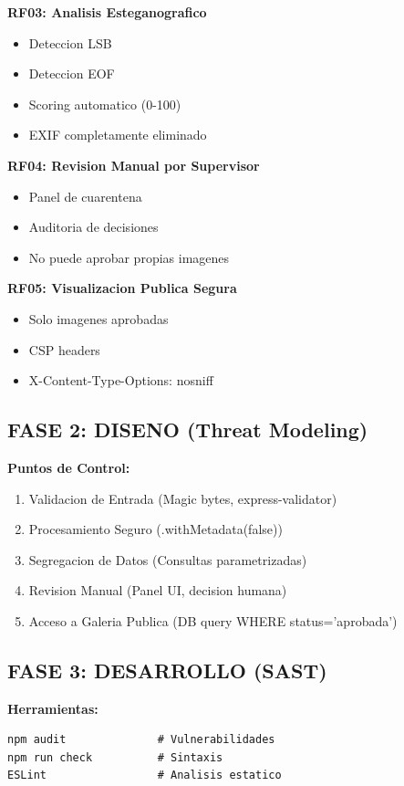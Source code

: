 \documentclass[12pt,a4paper]{article}
\begin{document}
\textbf{RF03: Analisis Esteganografico}
\begin{itemize}
    \item Deteccion LSB
    \item Deteccion EOF
    \item Scoring automatico (0-100)
    \item EXIF completamente eliminado
\end{itemize}

\textbf{RF04: Revision Manual por Supervisor}
\begin{itemize}
    \item Panel de cuarentena
    \item Auditoria de decisiones
    \item No puede aprobar propias imagenes
\end{itemize}

\textbf{RF05: Visualizacion Publica Segura}
\begin{itemize}
    \item Solo imagenes aprobadas
    \item CSP headers
    \item X-Content-Type-Options: nosniff
\end{itemize}

\subsection{FASE 2: DISENO (Threat Modeling)}

\textbf{Puntos de Control:}

\begin{enumerate}
    \item Validacion de Entrada (Magic bytes, express-validator)
    \item Procesamiento Seguro (.withMetadata(false))
    \item Segregacion de Datos (Consultas parametrizadas)
    \item Revision Manual (Panel UI, decision humana)
    \item Acceso a Galeria Publica (DB query WHERE status='aprobada')
\end{enumerate}

\subsection{FASE 3: DESARROLLO (SAST)}

\textbf{Herramientas:}

\begin{lstlisting}
npm audit              # Vulnerabilidades
npm run check          # Sintaxis
ESLint                 # Analisis estatico
\end{lstlisting}
\end{document}

